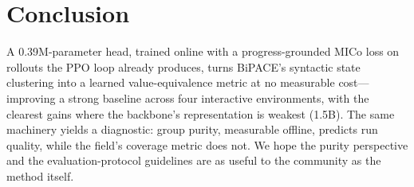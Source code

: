 \documentclass[sigconf]{acmart}
\begin{document}
\section{Conclusion}
\label{sec:conclusion}

A 0.39M-parameter head, trained online with a progress-grounded MICo
loss on rollouts the PPO loop already produces, turns BiPACE's
syntactic state clustering into a learned value-equivalence metric at
no measurable cost---improving a strong baseline across four
interactive environments, with the clearest gains where the backbone's
representation is weakest (1.5B). The same machinery yields a
diagnostic: group purity, measurable offline, predicts run quality,
while the field's coverage metric does not. We hope the purity
perspective and the evaluation-protocol guidelines are as useful to the
community as the method itself.



\end{document}
